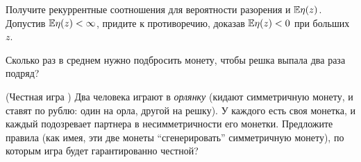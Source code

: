 \begin{ordre}
Получите рекуррентные соотношения для вероятности разорения и  $\mathrm{{\mathbb E}} \eta(z)$. Допустив  $\mathrm{{\mathbb E}} \eta(z) < \infty$, придите к противоречию, доказав $\mathrm{{\mathbb E}} \eta(z) < 0$ при больших $z$.
\end{ordre}

\begin{problem}
Сколько раз в среднем нужно подбросить монету, чтобы решка выпала два раза подряд?
\end{problem}



\begin{problem} (Честная игра \cite{book2012})
Два человека играют в {\it орлянку} (кидают симметричную монету, и ставят по рублю: один на орла, другой на решку). У каждого есть своя монетка, и каждый подозревает партнера в несимметричности его монетки. Предложите правила (как имея, эти две монеты ``сгенерировать'' симметричную монету), по которым игра будет гарантированно честной?
\end{problem}